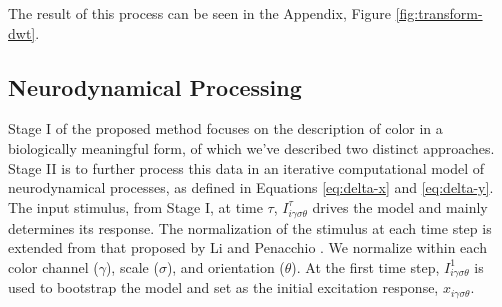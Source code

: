 \documentclass[journal,onecolumn]{IEEEtran}
\begin{document}
The result of this process can be seen in the Appendix, Figure \ref{fig:transform-dwt}.


\subsection*{Neurodynamical Processing}

Stage I of the proposed method focuses on the description of color in a biologically meaningful form, of which we've described two distinct approaches. Stage II is to further process this data in an iterative computational model of neurodynamical processes, as defined in Equations \ref{eq:delta-x} and \ref{eq:delta-y}. The input stimulus, from Stage I, at time $\tau$, $I^\tau_{i\gamma\sigma\theta}$ drives the model and mainly determines its response. The normalization of the stimulus at each time step is extended from that proposed by Li \cite{li:1999} and Penacchio \cite{penacchio:2013}. We normalize within each color channel ($\gamma$), scale ($\sigma$), and orientation ($\theta$). At the first time step, $I^1_{i\gamma\sigma\theta}$ is used to bootstrap the model and set as the initial excitation response, $x_{i\gamma\sigma\theta}$.
\end{document}
